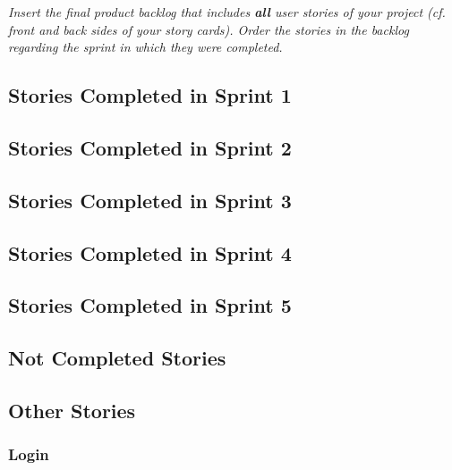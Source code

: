 \emph{Insert the final product backlog that includes \textbf{all} user stories of your project (cf. front and back sides of your story cards). Order the stories in the backlog regarding the sprint in which they were completed.}

\subsection{Stories Completed in Sprint 1}


\subsection{Stories Completed in Sprint 2}


\subsection{Stories Completed in Sprint 3}


\subsection{Stories Completed in Sprint 4}


\subsection{Stories Completed in Sprint 5}


\subsection{Not Completed Stories}


\subsection{Other Stories}



\subsubsection{Login}


